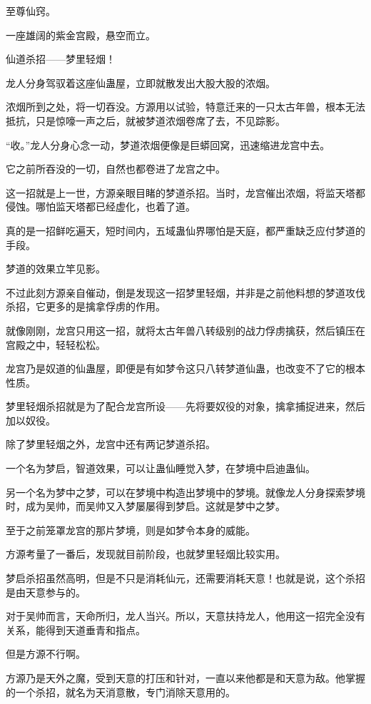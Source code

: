 
\begin{this_body}

至尊仙窍。

一座雄阔的紫金宫殿，悬空而立。

仙道杀招——梦里轻烟！

龙人分身驾驭着这座仙蛊屋，立即就散发出大股大股的浓烟。

浓烟所到之处，将一切吞没。方源用以试验，特意迁来的一只太古年兽，根本无法抵抗，只是惊嚎一声之后，就被梦道浓烟卷席了去，不见踪影。

“收。”龙人分身心念一动，梦道浓烟便像是巨蟒回窝，迅速缩进龙宫中去。

它之前所吞没的一切，自然也都卷进了龙宫之中。

这一招就是上一世，方源亲眼目睹的梦道杀招。当时，龙宫催出浓烟，将监天塔都侵蚀。哪怕监天塔都已经虚化，也着了道。

真的是一招鲜吃遍天，短时间内，五域蛊仙界哪怕是天庭，都严重缺乏应付梦道的手段。

梦道的效果立竿见影。

不过此刻方源亲自催动，倒是发现这一招梦里轻烟，并非是之前他料想的梦道攻伐杀招，它更多的是擒拿俘虏的作用。

就像刚刚，龙宫只用这一招，就将太古年兽八转级别的战力俘虏擒获，然后镇压在宫殿之中，轻轻松松。

龙宫乃是奴道的仙蛊屋，即便是有如梦令这只八转梦道仙蛊，也改变不了它的根本性质。

梦里轻烟杀招就是为了配合龙宫所设——先将要奴役的对象，擒拿捕捉进来，然后加以奴役。

除了梦里轻烟之外，龙宫中还有两记梦道杀招。

一个名为梦启，智道效果，可以让蛊仙睡觉入梦，在梦境中启迪蛊仙。

另一个名为梦中之梦，可以在梦境中构造出梦境中的梦境。就像龙人分身探索梦境时，成为吴帅，而吴帅又入梦屡屡得到梦启。这就是梦中之梦。

至于之前笼罩龙宫的那片梦境，则是如梦令本身的威能。

方源考量了一番后，发现就目前阶段，也就梦里轻烟比较实用。

梦启杀招虽然高明，但是不只是消耗仙元，还需要消耗天意！也就是说，这个杀招是由天意参与的。

对于吴帅而言，天命所归，龙人当兴。所以，天意扶持龙人，他用这一招完全没有关系，能得到天道垂青和指点。

但是方源不行啊。

方源乃是天外之魔，受到天意的打压和针对，一直以来他都是和天意为敌。他掌握的一个杀招，就名为天消意散，专门消除天意用的。


\end{this_body}
